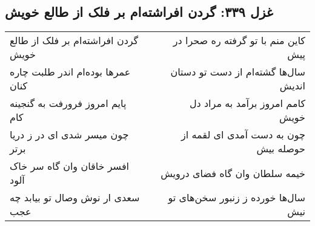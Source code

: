 \begin{center}
\section*{غزل ۳۳۹: گردن افراشته‌ام بر فلک از طالع خویش}
\label{sec:339}
\begin{longtable}{l p{0.5cm} r}
گردن افراشته‌ام بر فلک از طالع خویش
&&
کاین منم با تو گرفته ره صحرا در پیش
\\
عمرها بوده‌ام اندر طلبت چاره کنان
&&
سال‌ها گشته‌ام از دست تو دستان اندیش
\\
پایم امروز فرورفت به گنجینه کام
&&
کامم امروز برآمد به مراد دل خویش
\\
چون میسر شدی ای در ز دریا برتر
&&
چون به دست آمدی ای لقمه از حوصله بیش
\\
افسر خاقان وان گاه سر خاک آلود
&&
خیمه سلطان وان گاه فضای درویش
\\
سعدی ار نوش وصال تو بیابد چه عجب
&&
سال‌ها خورده ز زنبور سخن‌های تو نیش
\\
\end{longtable}
\end{center}
